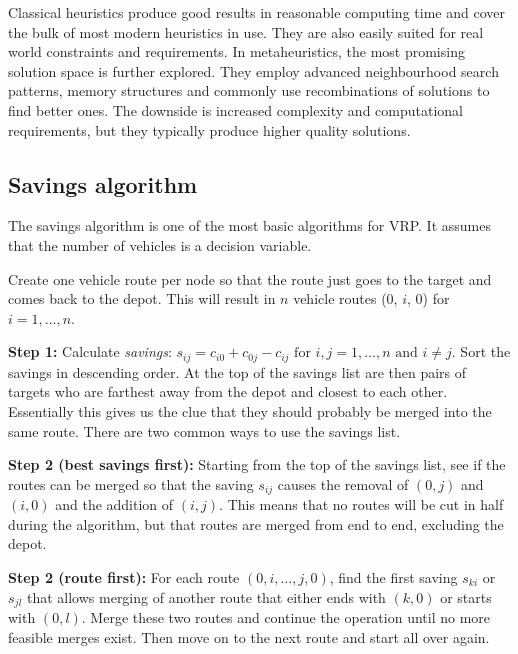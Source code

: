 Classical heuristics produce good results in reasonable computing time and cover the bulk of most modern heuristics in use. They are also easily suited for real world constraints and requirements. In metaheuristics, the most promising solution space is further explored. They employ advanced neighbourhood search patterns, memory structures and commonly use recombinations of solutions to find better ones. The downside is increased complexity and computational requirements, but they typically produce higher quality solutions. \cite{laporte2000classical}



\subsection{Savings algorithm}

The savings algorithm is one of the most basic algorithms for VRP. It assumes that the number of vehicles is a decision variable. 

\bigskip
\noindent
Create one vehicle route per node so that the route just goes to the target and comes back to the depot. This will result in $n$ vehicle routes (0, $i$, 0) for $i = 1, \ldots, n$. \cite{reimann2004d}

\medskip
\noindent
\textbf{Step 1:} Calculate \textit{savings}: $s_{ij} = c_{i0} + c_{0j} - c_{ij} \text{ for } i, j = 1, \ldots, n \text{ and } i \neq j$. Sort the savings in descending order. \cite{reimann2004d} At the top of the savings list are then pairs of targets who are farthest away from the depot and closest to each other. Essentially this gives us the clue that they should probably be merged into the same route. There are two common ways to use the savings list.


\medskip
\noindent
\textbf{Step 2 (best savings first):} Starting from the top of the savings list, see if the routes can be merged so that the saving $s_{ij}$ causes the removal of $(0, j)$ and $(i, 0)$ and the addition of $(i, j)$. \cite{reimann2004d} This means that no routes will be cut in half during the algorithm, but that routes are merged from end to end, excluding the depot.

\medskip
\noindent
\textbf{Step 2 (route first):} For each route $(0, i, \ldots, j, 0)$, find the first saving $s_{ki}$ or $s_{jl}$ that allows merging of another route that either ends with $(k, 0)$ or starts with $(0, l)$. Merge these two routes and continue the operation until no more feasible merges exist. Then move on to the next route and start all over again. \cite{laporte2000classical}



